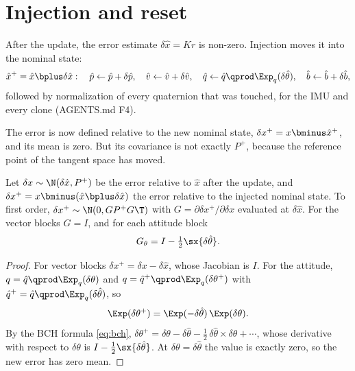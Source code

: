 \section{Injection and reset}
\label{sec:reset}

After the update, the error estimate $\delta\hat x = Kr$ is non-zero. Injection moves it into the nominal
state:
\begin{equation}
  \hat x^+ = \hat x\bplus\delta\hat x:\quad
  \hat p \gets \hat p + \delta\hat p,\quad \hat v \gets \hat v + \delta\hat v,\quad
  \hat q \gets \hat q\qprod\Exp_q(\delta\hat\theta),\quad \hat b \gets \hat b + \delta\hat b,
\end{equation}
followed by normalization of every quaternion that was touched, for the IMU and every clone (AGENTS.md F4).

The error is now defined relative to the new nominal state, $\delta x^+ = x\bminus\hat x^+$, and its mean is zero.
But its covariance is not exactly $P^+$, because the reference point of the tangent space has moved.

\begin{proposition}
\label{prop:reset}
Let $\delta x \sim \N(\delta\hat x, P^+)$ be the error relative to $\hat x$ after the update, and
$\delta x^+ = x\bminus(\hat x\bplus\delta\hat x)$ the error relative to the injected nominal state. To first order,
$\delta x^+ \sim \N(0, GP^+G\T)$ with $G = \partial\delta x^+/\partial\delta x$ evaluated at $\delta\hat x$. For the vector
blocks $G = I$, and for each attitude block
\begin{equation}
  G_\theta = I - \tfrac12\sx{\delta\hat\theta}.
  \label{eq:reset-G}
\end{equation}
\end{proposition}
\begin{proof}
For vector blocks $\delta x^+ = \delta x - \delta\hat x$, whose Jacobian is $I$. For the attitude, $q = \hat q\qprod\Exp_q(\delta\theta)$
and $q = \hat q^+\qprod\Exp_q(\delta\theta^+)$ with $\hat q^+ = \hat q\qprod\Exp_q(\delta\hat\theta)$, so
\begin{equation*}
  \Exp(\delta\theta^+) = \Exp(-\delta\hat\theta)\,\Exp(\delta\theta).
\end{equation*}
By the BCH formula \eqref{eq:bch}, $\delta\theta^+ = \delta\theta - \delta\hat\theta - \tfrac12\,\delta\hat\theta\times\delta\theta + \cdots$,
whose derivative with respect to $\delta\theta$ is $I - \tfrac12\sx{\delta\hat\theta}$. At $\delta\theta = \delta\hat\theta$ the value is
exactly zero, so the new error has zero mean.
\end{proof}

